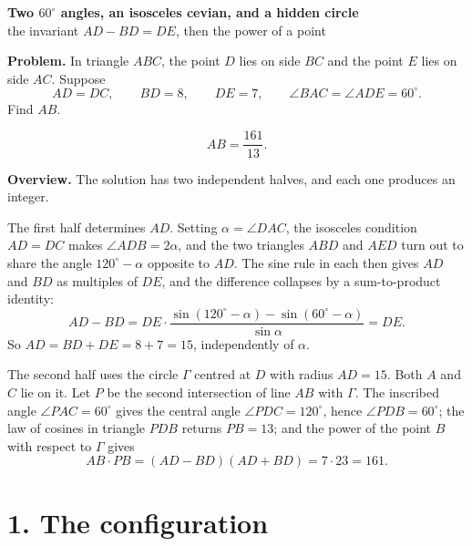 \documentclass[12pt]{article}
\newcommand{\ang}{^\circ}
\newcommand{\Gam}{\Gamma}
\begin{document}
\begin{center}
{\Large\bfseries Two \(60\ang\) angles, an isosceles cevian, and a hidden circle}\\[0.35em]
{\large the invariant \(AD-BD=DE\), then the power of a point}
\end{center}

\textbf{Problem.} In triangle \(ABC\), the point \(D\) lies on side
\(BC\) and the point \(E\) lies on side \(AC\). Suppose
\[
AD=DC,\qquad BD=8,\qquad DE=7,\qquad
\angle BAC=\angle ADE=60\ang .
\]
Find \(AB\).

\[
\boxed{\displaystyle AB=\frac{161}{13}.}
\]

\textbf{Overview.}
The solution has two independent halves, and each one produces an
integer.

The first half determines \(AD\). Setting \(\alpha=\angle DAC\), the
isosceles condition \(AD=DC\) makes \(\angle ADB=2\alpha\), and the two
triangles \(ABD\) and \(AED\) turn out to share the angle
\(120\ang-\alpha\) opposite to \(AD\). The sine rule in each then gives
\(AD\) and \(BD\) as multiples of \(DE\), and the difference collapses by
a sum-to-product identity:
\[
AD-BD=DE\cdot\frac{\sin(120\ang-\alpha)-\sin(60\ang-\alpha)}{\sin\alpha}
=DE .
\]
So \(AD=BD+DE=8+7=15\), independently of \(\alpha\).

The second half uses the circle \(\Gam\) centred at \(D\) with radius
\(AD=15\). Both \(A\) and \(C\) lie on it. Let \(P\) be the second
intersection of line \(AB\) with \(\Gam\). The inscribed angle
\(\angle PAC=60\ang\) gives the central angle \(\angle PDC=120\ang\),
hence \(\angle PDB=60\ang\); the law of cosines in triangle \(PDB\)
returns \(PB=13\); and the power of the point \(B\) with respect to
\(\Gam\) gives
\[
AB\cdot PB=(AD-BD)(AD+BD)=7\cdot23=161 .
\]

\section*{1. The configuration}
\end{document}
